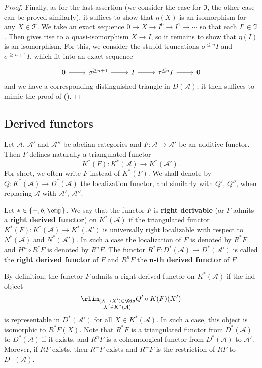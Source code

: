 \begin{proof}
Finally, as for the last assertion (we consider the case for $\mathfrak{I}$, the other case can be proved similarly), it suffices to show that $\eta(X)$ is an isomorphism for any $X\in\mathcal{T}$. We take an exact sequence $0\to X\to I^0\to I^1\to\cdots$ so that each $I^i\in\mathfrak{I}$. Then gives rise to a quasi-isomorphism $X\to I$, so it remains to show that $\eta(I)$ is an isomorphism. For this, we consider the stupid truncations $\sigma^{\leq n}I$ and $\sigma^{\geq n+1}I$, which fit into an exact sequence
\[\begin{tikzcd}
0\ar[r]&\sigma^{\geq n+1}\ar[r]&I\ar[r]&\tau^{\leq n}I\ar[r]&0
\end{tikzcd}\]
and we have a corresponding distinguished triangle in $D(\mathcal{A})$; it then suffices to mimic the proof of ().
\end{proof}
\subsection{Derived functors}
Let $\mathcal{A}$, $\mathcal{A}'$ and $\mathcal{A}''$ be abelian categories and $F:\mathcal{A}\to\mathcal{A}'$ be an additive functor. Then $F$ defines naturally a triangulated functor
\[K^*(F):K^*(\mathcal{A})\to K^*(\mathcal{A}').\]
For short, we often write $F$ instead of $K^*(F)$. We shall denote by $Q:K^*(\mathcal{A})\to D^*(\mathcal{A})$ the localization functor, and similarly with $Q'$, $Q''$, when replacing $\mathcal{A}$ with $\mathcal{A}'$, $\mathcal{A}''$.

\begin{definition}
Let $*\in\{+,b,\emp\}$. We say that the functor $F$ is \textbf{right derivable} (or $F$ admits a \textbf{right derived functor}) on $K^*(\mathcal{A})$ if the triangulated functor $K^*(F):K^*(\mathcal{A})\to K^*(\mathcal{A}')$ is universally right localizable with respect to $N^*(\mathcal{A})$ and $N^*(\mathcal{A}')$. In such a case the localization of $F$ is denoted by $R^*F$ and $H^n\circ R^*F$ is denoted by $R^nF$. The functor $R^*F:D^*(\mathcal{A})\to D^*(\mathcal{A}')$ is called the \textbf{right derived functor} of $F$ and $R^nF$ the \textbf{$\bm{n}$-th derived functor} of $F$.
\end{definition}

By definition, the functor $F$ admits a right derived functor on $K^*(\mathcal{A})$ if the ind-object
\[\rlim_{\substack{(X\to X')\in\Qis\\ X'\in K^*(\mathcal{A})}}Q'\circ K(F)(X')\]
is representable in $D^*(\mathcal{A}')$ for all $X\in K^*(\mathcal{A})$. In such a case, this object is isomorphic to $R^*F(X)$. Note that $R^*F$ is a triangulated functor from $D^*(\mathcal{A})$ to $D^*(\mathcal{A})$ if it exists, and $R^nF$ is a cohomological functor from $D^*(\mathcal{A})$ to $\mathcal{A}'$. Morever, if $RF$ exists, then $R^+F$ exists and $R^+F$ is the restriction of $RF$ to $D^+(\mathcal{A})$.


